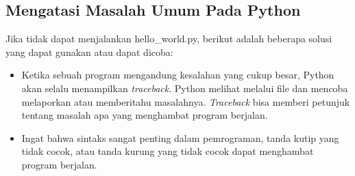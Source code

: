 \subsection{Mengatasi Masalah Umum Pada Python}
Jika tidak dapat menjalankan hello\_world.py, berikut adalah beberapa solusi yang dapat gunakan atau dapat dicoba:
\begin{itemize}
\item Ketika sebuah program mengandung kesalahan yang cukup besar, Python akan selalu menampilkan \textit{traceback}. Python melihat melalui file dan mencoba melaporkan atau memberitahu masalahnya. \textit{Traceback} bisa memberi petunjuk tentang masalah apa yang menghambat program berjalan.
\item  Ingat bahwa sintaks sangat penting dalam pemrograman, tanda kutip yang tidak cocok, atau tanda kurung yang tidak cocok dapat menghambat program berjalan.
\end{itemize}
